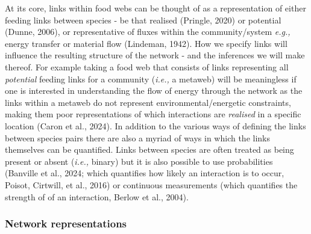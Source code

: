 \documentclass[
]{article}
\begin{document}
At its core, links within food webs can be thought of as a
representation of either feeding links between species - be that
realised (Pringle, 2020) or potential (Dunne, 2006), or representative
of fluxes within the community/system \emph{e.g.,} energy transfer or
material flow (Lindeman, 1942). How we specify links will influence the
resulting structure of the network - and the inferences we will make
thereof. For example taking a food web that consists of links
representing all \emph{potential} feeding links for a community
(\emph{i.e.,} a metaweb) will be meaningless if one is interested in
understanding the flow of energy through the network as the links within
a metaweb do not represent environmental/energetic constraints, making
them poor representations of which interactions are \emph{realised} in a
specific location (Caron et al., 2024). In addition to the various ways
of defining the links between species pairs there are also a myriad of
ways in which the links themselves can be quantified. Links between
species are often treated as being present or absent (\emph{i.e.,}
binary) but it is also possible to use probabilities (Banville et al.,
2024; which quantifies how likely an interaction is to occur, Poisot,
Cirtwill, et al., 2016) or continuous measurements (which quantifies the
strength of of an interaction, Berlow et al., 2004).

\subsubsection{Network representations}\label{network-representations}
\end{document}
